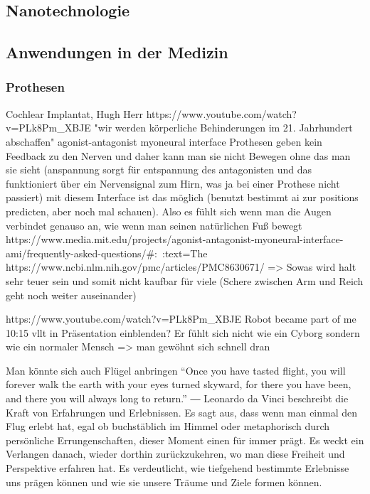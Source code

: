 \documentclass[a4paper,
DIV=13,
12pt,
BCOR=10mm,
department=FakEI,
twoside,
parskip=half,
automark,
]{OTHRartcl}
\begin{document}
\subsection*{Nanotechnologie}

\subsection*{Anwendungen in der Medizin}
\subsubsection*{Prothesen}
Cochlear Implantat, Hugh Herr https://www.youtube.com/watch?v=PLk8Pm_XBJE "wir werden körperliche Behinderungen im 21. Jahrhundert abschaffen"
agonist-antagonist myoneural interface Prothesen geben kein Feedback zu den Nerven und daher kann man sie nicht Bewegen ohne das man sie sieht
(anspannung sorgt für entspannung des antagonisten und das funktioniert über ein Nervensignal zum Hirn, was ja bei einer Prothese nicht passiert)
mit diesem Interface ist das möglich (benutzt bestimmt ai zur positions predicten, aber noch mal schauen). Also es fühlt sich wenn man die Augen 
verbindet genauso an, wie wenn man seinen natürlichen Fuß bewegt
https://www.media.mit.edu/projects/agonist-antagonist-myoneural-interface-ami/frequently-asked-questions/#:~:text=The%
https://www.ncbi.nlm.nih.gov/pmc/articles/PMC8630671/
=> Sowas wird halt sehr teuer sein und somit nicht kaufbar für viele (Schere zwischen Arm und Reich geht noch weiter auseinander)

https://www.youtube.com/watch?v=PLk8Pm_XBJE Robot became part of me 10:15 vllt in Präsentation einblenden? Er fühlt sich nicht wie ein Cyborg
sondern wie ein normaler Mensch => man gewöhnt sich schnell dran

Man könnte sich auch Flügel anbringen
“Once you have tasted flight, you will forever walk the earth with your eyes turned skyward, for there you have been, and there you will always long to return.”
― Leonardo da Vinci
beschreibt die Kraft von Erfahrungen und Erlebnissen. Es sagt aus, dass wenn man einmal den Flug erlebt hat, egal ob buchstäblich im Himmel oder metaphorisch durch persönliche Errungenschaften,
dieser Moment einen für immer prägt. Es weckt ein Verlangen danach, wieder dorthin zurückzukehren, wo man diese Freiheit und Perspektive erfahren hat. Es verdeutlicht, wie tiefgehend bestimmte Erlebnisse uns prägen können und wie sie unsere Träume und Ziele formen können.
\end{document}

